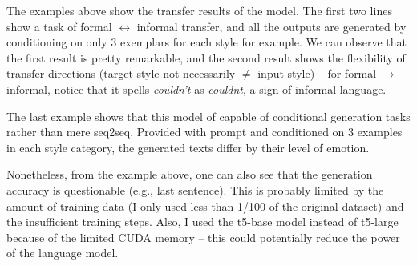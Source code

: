 \documentclass[a2paper]{article}
\begin{document}
The examples above show the transfer results of the model. The first two lines show a task of formal $\leftrightarrow$ informal transfer, and all the outputs are generated by conditioning on only 3 exemplars for each style for example. We can observe that the first result is pretty remarkable, and the second result shows the flexibility of transfer directions (target style not necessarily $\ne$ input style) -- for formal $\rightarrow$ informal, notice that it spells \textit{couldn’t} as \textit{couldnt}, a sign of informal language.

The last example shows that this model of capable of conditional generation tasks rather than mere seq2seq. Provided with prompt and conditioned on 3 examples in each style category, the generated texts differ by their level of emotion.

Nonetheless, from the example above, one can also see that the generation accuracy is questionable (e.g., last sentence). This is probably limited by the amount of training data (I only used less than 1/100 of the original dataset) and the insufficient training steps. Also, I used the t5-base model instead of t5-large because of the limited CUDA memory -- this could potentially reduce the power of the language model.
\end{document}
